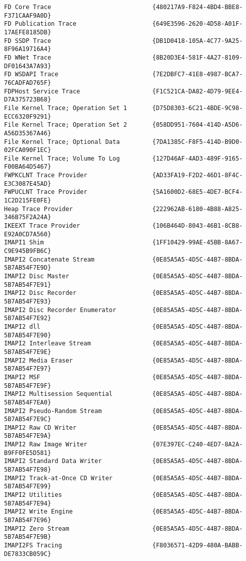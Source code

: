 \documentclass{report}
\begin{document}
\begin{lstlisting}[breaklines=true,basicstyle=\tiny]
FD Core Trace                            {480217A9-F824-4BD4-BBE8-F371CAAF9A0D}
FD Publication Trace                     {649E3596-2620-4D58-A01F-17AEFE8185DB}
FD SSDP Trace                            {DB1D0418-105A-4C77-9A25-8F96A19716A4}
FD WNet Trace                            {8B20D3E4-581F-4A27-8109-DF01643A7A93}
FD WSDAPI Trace                          {7E2DBFC7-41E8-4987-BCA7-76CADFAD765F}
FDPHost Service Trace                    {F1C521CA-DA82-4D79-9EE4-D7A375723B68}
File Kernel Trace; Operation Set 1       {D75D8303-6C21-4BDE-9C98-ECC6320F9291}
File Kernel Trace; Operation Set 2       {058DD951-7604-414D-A5D6-A56D35367A46}
File Kernel Trace; Optional Data         {7DA1385C-F8F5-414D-B9D0-02FCA090F1EC}
File Kernel Trace; Volume To Log         {127D46AF-4AD3-489F-9165-F00BA64D5467}
FWPKCLNT Trace Provider                  {AD33FA19-F2D2-46D1-8F4C-E3C3087E45AD}
FWPUCLNT Trace Provider                  {5A1600D2-68E5-4DE7-BCF4-1C2D215FE0FE}
Heap Trace Provider                      {222962AB-6180-4B88-A825-346B75F2A24A}
IKEEXT Trace Provider                    {106B464D-8043-46B1-8CB8-E92A0CD7A560}
IMAPI1 Shim                              {1FF10429-99AE-45BB-8A67-C9E945B9FB6C}
IMAPI2 Concatenate Stream                {0E85A5A5-4D5C-44B7-8BDA-5B7AB54F7E9D}
IMAPI2 Disc Master                       {0E85A5A5-4D5C-44B7-8BDA-5B7AB54F7E91}
IMAPI2 Disc Recorder                     {0E85A5A5-4D5C-44B7-8BDA-5B7AB54F7E93}
IMAPI2 Disc Recorder Enumerator          {0E85A5A5-4D5C-44B7-8BDA-5B7AB54F7E92}
IMAPI2 dll                               {0E85A5A5-4D5C-44B7-8BDA-5B7AB54F7E90}
IMAPI2 Interleave Stream                 {0E85A5A5-4D5C-44B7-8BDA-5B7AB54F7E9E}
IMAPI2 Media Eraser                      {0E85A5A5-4D5C-44B7-8BDA-5B7AB54F7E97}
IMAPI2 MSF                               {0E85A5A5-4D5C-44B7-8BDA-5B7AB54F7E9F}
IMAPI2 Multisession Sequential           {0E85A5A5-4D5C-44B7-8BDA-5B7AB54F7EA0}
IMAPI2 Pseudo-Random Stream              {0E85A5A5-4D5C-44B7-8BDA-5B7AB54F7E9C}
IMAPI2 Raw CD Writer                     {0E85A5A5-4D5C-44B7-8BDA-5B7AB54F7E9A}
IMAPI2 Raw Image Writer                  {07E397EC-C240-4ED7-8A2A-B9FF0FE5D581}
IMAPI2 Standard Data Writer              {0E85A5A5-4D5C-44B7-8BDA-5B7AB54F7E98}
IMAPI2 Track-at-Once CD Writer           {0E85A5A5-4D5C-44B7-8BDA-5B7AB54F7E99}
IMAPI2 Utilities                         {0E85A5A5-4D5C-44B7-8BDA-5B7AB54F7E94}
IMAPI2 Write Engine                      {0E85A5A5-4D5C-44B7-8BDA-5B7AB54F7E96}
IMAPI2 Zero Stream                       {0E85A5A5-4D5C-44B7-8BDA-5B7AB54F7E9B}
IMAPI2FS Tracing                         {F8036571-42D9-480A-BABB-DE7833CB059C}

\end{lstlisting}
\end{document}
